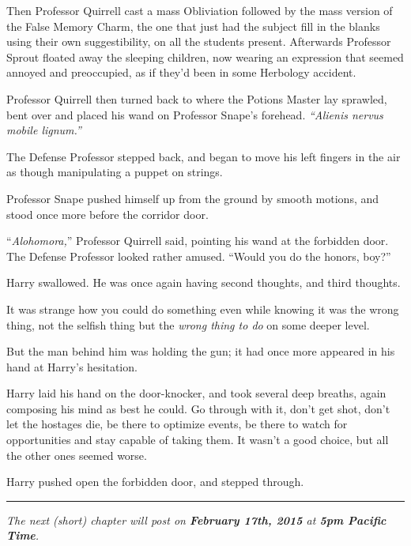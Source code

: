 Then Professor Quirrell cast a mass Obliviation followed by the mass version of the False Memory Charm, the one that just had the subject fill in the blanks using their own suggestibility, on all the students present. Afterwards Professor Sprout floated away the sleeping children, now wearing an expression that seemed annoyed and preoccupied, as if they'd been in some Herbology accident.

Professor Quirrell then turned back to where the Potions Master lay sprawled, bent over and placed his wand on Professor Snape's forehead. \emph{``Alienis nervus mobile lignum.''}

The Defense Professor stepped back, and began to move his left fingers in the air as though manipulating a puppet on strings.

Professor Snape pushed himself up from the ground by smooth motions, and stood once more before the corridor door.

``\emph{Alohomora,}'' Professor Quirrell said, pointing his wand at the forbidden door. The Defense Professor looked rather amused. ``Would you do the honors, boy?''

Harry swallowed. He was once again having second thoughts, and third thoughts.

It was strange how you could do something even while knowing it was the wrong thing, not the selfish thing but the \emph{wrong thing to do} on some deeper level.

But the man behind him was holding the gun; it had once more appeared in his hand at Harry's hesitation.

Harry laid his hand on the door-knocker, and took several deep breaths, again composing his mind as best he could. Go through with it, don't get shot, don't let the hostages die, be there to optimize events, be there to watch for opportunities and stay capable of taking them. It wasn't a good choice, but all the other ones seemed worse.

Harry pushed open the forbidden door, and stepped through.

\begin{center}\rule{3in}{0.4pt}\end{center}

\emph{The next (short) chapter will post on \textbf{February 17th, 2015} at \textbf{5pm Pacific Time}.}
